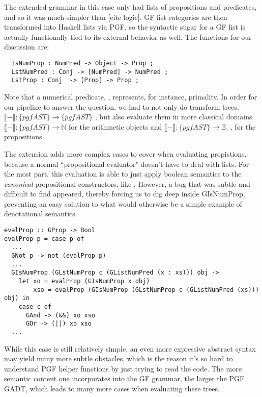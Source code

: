 The extended grammar in this case only had lists of propositions and predicates,
and so it was much simpler than [cite logic]. GF list categories are then
transformed into Haskell lists via PGF, so the syntactic sugar for a GF list is actually
functionally tied to its external behavior as well. The functions for our
discussion are:
\begin{verbatim}
  IsNumProp : NumPred -> Object -> Prop ;
  LstNumPred : Conj -> [NumPred] -> NumPred ;
  LstProp : Conj  -> [Prop] -> Prop ;
\end{verbatim}

Note that a numerical predicate, , represents, for instance,
primality. In order for our pipeline to answer the question, we had to not only
do transform trees, $\llbracket - \rrbracket : \{pgfAST\} \rightarrow
\{pgfAST\}$ , but also evaluate them in more classical domains $\llbracket -
\rrbracket : \{pgfAST\} \rightarrow \mathds{N}$ for the arithmetic objects and
$\llbracket - \rrbracket : \{pgfAST\} \rightarrow \mathds{B}$,
, for the propositions.

The extension adds more complex cases  to cover when
evaluating propistions, because a normal ``propositional evaluator" doesn't have to
deal with lists. For the most part, this evaluation is able to just apply
boolean semantics to the \emph{canonical} propositional constructors, like . However, a
bug that was subtle and difficult to find appeared, thereby forcing us to dig
deep inside GIsNumProp, preventing an easy solution to what would otherwise be a
simple example of denotational semantics.
\begin{verbatim}
evalProp :: GProp -> Bool
evalProp p = case p of
  ...
  GNot p -> not (evalProp p)
  ...
  GIsNumProp (GLstNumProp c (GListNumPred (x : xs))) obj ->
    let xo = evalProp (GIsNumProp x obj)
        xso = evalProp (GIsNumProp (GLstNumProp c (GListNumPred (xs))) obj) in
    case c of
      GAnd -> (&&) xo xso
      GOr -> (||) xo xso
  ...
\end{verbatim}
While this case is still relatively simple, an even more expressive abstract syntax
may yield many more subtle obstacles, which is the reason it's so hard
to understand PGF helper functions by just trying to read the code. The more semantic content one
incorporates into the GF grammar, the larger the PGF GADT, which leads to many
more cases when evaluating these trees.

